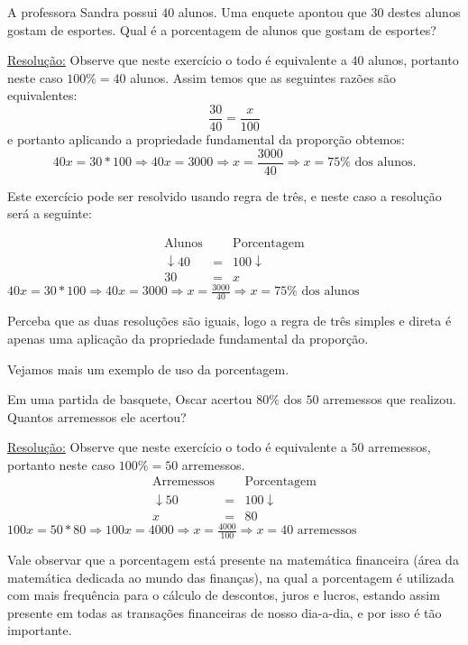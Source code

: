 \begin{exem}
 A professora Sandra possui $40$ alunos. Uma enquete apontou que $30$ destes alunos gostam de esportes. Qual é a porcentagem de alunos que gostam de esportes?

 \underline{Resolução:}
 Observe que neste exercício o todo é equivalente a $40$ alunos, portanto neste caso $100 \%= 40$ alunos. Assim temos que as seguintes razões são equivalentes:
  \[\frac{30}{40}= \frac{x}{100}\]
  e portanto aplicando a propriedade fundamental da proporção obtemos:
  \[40 x = 30*100 \Rightarrow 40 x = 3000 \Rightarrow x = \frac{3000}{40} \Rightarrow x=  75 \% \text{ dos alunos}.\]

 Este exercício pode ser resolvido usando regra de três, e neste caso a resolução será a seguinte:

  \begin{eqnarray*}
  \text{Alunos} & & \text{Porcentagem} \\
  \downarrow 40 & = & 100 \downarrow \\
  30 & = & x
 \end{eqnarray*}
 $40 x = 30*100 \Rightarrow 40 x = 3000 \Rightarrow x = \frac{3000}{40} \Rightarrow x=  75 \% \text{ dos alunos}$

 Perceba que as duas resoluções são iguais, logo a regra de três simples e direta é apenas uma aplicação da propriedade fundamental da proporção.
 \fim

\end{exem}

Vejamos mais um exemplo de uso da porcentagem.

\begin{exem}
 Em uma partida de basquete, Oscar acertou $80\%$ dos $50$ arremessos que realizou. Quantos arremessos ele acertou?

 \underline{Resolução:}
 Observe que neste exercício o todo é equivalente a $50$ arremessos, portanto neste caso $100 \%= 50$ arremessos.
  \begin{eqnarray*}
  \text{Arremessos} & & \text{Porcentagem} \\
  \downarrow 50 & = & 100 \downarrow \\
  x & = & 80
 \end{eqnarray*}
 $100 x = 50*80 \Rightarrow 100 x = 4000 \Rightarrow x = \frac{4000}{100} \Rightarrow x= 40 \text{ arremessos}$
 \fim

\end{exem}

Vale observar que a porcentagem está presente na matemática financeira (área da matemática dedicada ao mundo das finanças), na qual a porcentagem é utilizada com mais frequência para o cálculo de descontos, juros e lucros, estando assim presente em todas as transações financeiras de nosso dia-a-dia, e por isso é tão importante.
